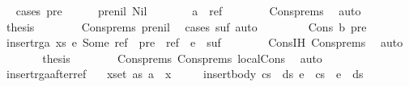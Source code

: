 \begin{isabellebody}
\ \ \isamarkupfalse%
{\isacharparenleft}cases\ pre{\isacharparenright}\isanewline
\ \ \ \ \isamarkupfalse%
\ pre{\isacharunderscore}nil{\isacharcolon}\ Nil\isanewline
\ \ \ \ \isamarkupfalse%
\ \isamarkupfalse%
\ {\isachardoublequoteopen}a\ {\isacharequal}\ ref{\isachardoublequoteclose}\isanewline
\ \ \ \ \ \ \isamarkupfalse%
\ Cons{\isachardot}prems{\isacharparenleft}{}{\isacharparenright}\ \isamarkupfalse%
\ auto\isanewline
\ \ \ \ \isamarkupfalse%
\ \isamarkupfalse%
\ {\isacharquery}thesis\isanewline
\ \ \ \ \ \ \isamarkupfalse%
\ Cons{\isachardot}prems\ pre{\isacharunderscore}nil\ \isamarkupfalse%
\ {\isacharparenleft}cases\ suf{\isacharcomma}\ auto{\isacharparenright}\isanewline
\ \ \isamarkupfalse%
\isanewline
\ \ \ \ \isamarkupfalse%
\ {\isacharparenleft}Cons\ b\ pre{\isacharprime}{\isacharparenright}\isanewline
\ \ \ \ \isamarkupfalse%
\ \isamarkupfalse%
\ {\isachardoublequoteopen}insert{\isacharunderscore}rga\ xs\ {\isacharparenleft}e{\isacharcomma}\ Some\ ref{\isacharparenright}\ {\isacharequal}\ pre{\isacharprime}\ {\isacharat}\ ref\ {\isacharhash}\ e\ {\isacharhash}\ suf{\isachardoublequoteclose}\isanewline
\ \ \ \ \ \ \isamarkupfalse%
\ Cons{\isachardot}IH\ Cons{\isachardot}prems\ \isamarkupfalse%
\ auto\isanewline
\ \ \ \ \isamarkupfalse%
\ \isamarkupfalse%
\ {\isacharquery}thesis\isanewline
\ \ \ \ \ \ \isamarkupfalse%
\ Cons{\isachardot}prems{\isacharparenleft}{}{\isacharparenright}\ Cons{\isachardot}prems{\isacharparenleft}{}{\isacharparenright}\ local{\isachardot}Cons\ \isamarkupfalse%
\ auto\isanewline
\ \ \isamarkupfalse%
\isanewline
{}\isamarkupfalse%
%
\endisatagproof
{\isafoldproof}%
%
\isadelimproof
\isanewline
%
\endisadelimproof
\isanewline
{}\isamarkupfalse%
\ insert{\isacharunderscore}rga{\isacharunderscore}after{\isacharunderscore}ref{\isacharcolon}\isanewline
\ \ \ {\isachardoublequoteopen}{\isasymforall}x{\isasymin}set\ as{\isachardot}\ a\ {\isasymnoteq}\ x{\isachardoublequoteclose}\isanewline
\ \ \ \ \ {\isachardoublequoteopen}insert{\isacharunderscore}body\ {\isacharparenleft}cs\ {\isacharat}\ ds{\isacharparenright}\ e\ {\isacharequal}\ cs\ {\isacharat}\ e\ {\isacharhash}\ ds{\isachardoublequoteclose}\isanewline

\end{isabellebody}
